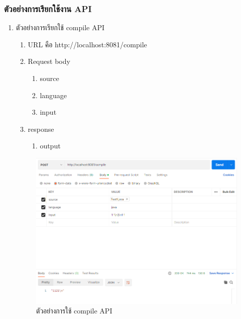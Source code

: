 \subsubsection{ตัวอย่างการเรียกใช้งาน API}
\begin{enumerate}
    \item ตัวอย่างการเรียกใช้ compile API
    \begin{enumerate}
            \item URL คือ http://localhost:8081/compile
            \item Request body
                \begin{enumerate}
                    \item source
                    \item language
                    \item input
                \end{enumerate}
            \item response
                \begin{enumerate}
                    \item output
                \end{enumerate}
        \end{enumerate}

    \begin{figure}[H]
            \centering
                \centering
                \includegraphics[width=5in]{latex/figures/compilepost.png}
            \caption{ตัวอย่างการใช้ compile API}
    \end{figure}


\end{enumerate}
